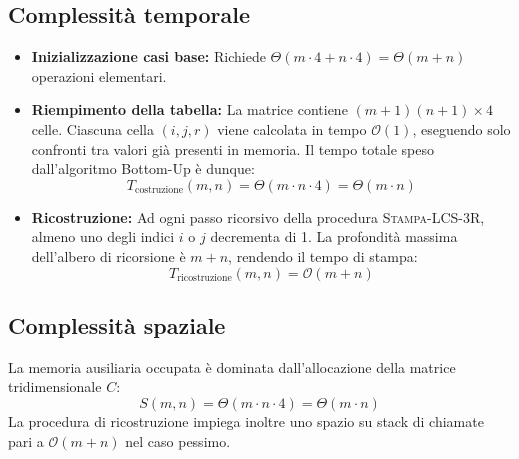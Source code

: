 \subsection{Complessità temporale}
\begin{itemize}
    \item \textbf{Inizializzazione casi base:} Richiede $\Theta(m \cdot 4 + n \cdot 4) = \Theta(m + n)$ operazioni elementari.
    \item \textbf{Riempimento della tabella:} La matrice contiene $(m+1)(n+1) \times 4$ celle. Ciascuna cella $(i, j, r)$ viene calcolata in tempo $\mathcal{O}(1)$, eseguendo solo confronti tra valori già presenti in memoria. Il tempo totale speso dall'algoritmo Bottom-Up è dunque:
    \begin{equation*}
        T_{\text{costruzione}}(m, n) = \Theta(m \cdot n \cdot 4) = \Theta(m \cdot n)
    \end{equation*}
    \item \textbf{Ricostruzione:} Ad ogni passo ricorsivo della procedura \textsc{Stampa-LCS-3R}, almeno uno degli indici $i$ o $j$ decrementa di 1. La profondità massima dell'albero di ricorsione è $m + n$, rendendo il tempo di stampa:
    \begin{equation*}
        T_{\text{ricostruzione}}(m, n) = \mathcal{O}(m + n)
    \end{equation*}
\end{itemize}

\subsection{Complessità spaziale}
La memoria ausiliaria occupata è dominata dall'allocazione della matrice tridimensionale $C$:
\begin{equation*}
    S(m, n) = \Theta(m \cdot n \cdot 4) = \Theta(m \cdot n)
\end{equation*}
La procedura di ricostruzione impiega inoltre uno spazio su stack di chiamate pari a $\mathcal{O}(m + n)$ nel caso pessimo.